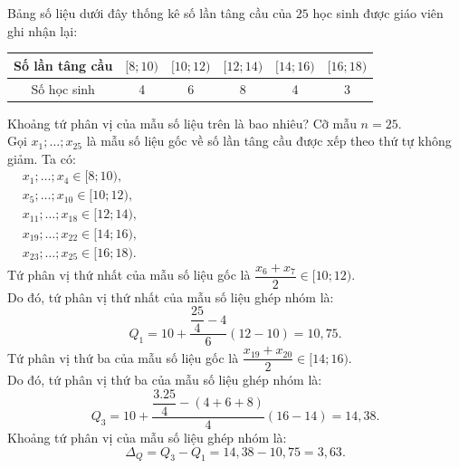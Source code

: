 \begin{ex}%
	Bảng số liệu dưới đây thống kê số lần tâng cầu của $25$ học sinh được giáo viên ghi nhận lại:
	\begin{center}
		\begin{tabular}{|c|c|c|c|c|c|}
			\hline Số lần tâng cầu & {$[8 ; 10)$} & {$[10 ; 12)$} & {$[12 ; 14)$} & {$[14 ; 16)$} & {$[16 ; 18)$} \\
			\hline Số học sinh & 4 & 6 & 8 & 4 & 3 \\
			\hline
		\end{tabular}
	\end{center}
	Khoảng tứ phân vị của mẫu số liệu trên là bao nhiêu?
	\loigiai
	{
		Cỡ mẫu $n=25$.\\
		Gọi $x_1; \ldots; x_{25}$ là mẫu số liệu gốc về số lần tâng cầu được xếp theo thứ tự không giảm.
		Ta có:\\
		$\begin{aligned}
			& x_1; \ldots; x_4 \in[8; 10), \\
			& x_5; \ldots; x_{10} \in[10; 12), \\
			& x_{11}; \ldots; x_{18} \in[12; 14), \\
			& x_{19}; \ldots; x_{22} \in[14; 16), \\
			& x_{23}; \ldots; x_{25} \in[16; 18).
		\end{aligned}$\\
		Tứ phân vị thứ nhất của mẫu số liệu gốc là $\dfrac{x_6+x_7}{2} \in[10; 12)$.\\ 
		Do đó, tứ phân vị thứ nhất của mẫu số liệu ghép nhóm là: $$Q_1=10+\dfrac{\dfrac{25}{4}-4}{6}(12-10)=10{,}75.$$
		Tứ phân vị thứ ba của mẫu số liệu gốc là $\dfrac{x_{19}+x_{20}}{2} \in[14; 16)$. \\
		Do đó, tứ phân vị thứ ba của mẫu số liệu ghép nhóm là: $$Q_3=10+\dfrac{\dfrac{3.25}{4}-(4+6+8)}{4}(16-14)=14{,}38.$$
		Khoảng tứ phân vị của mẫu số liệu ghép nhóm là: $$\Delta_Q=Q_3-Q_1=14{,}38-10{,}75=3{,}63.$$  	
	}
\end{ex}

